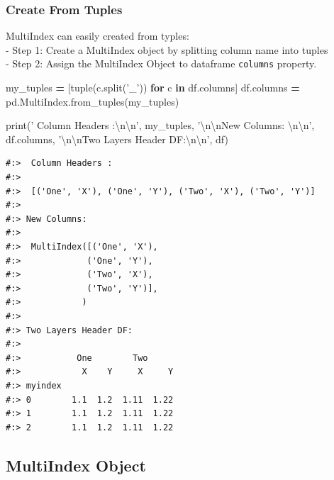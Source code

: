 \documentclass[
]{book}
\newenvironment{Shaded}{\begin{snugshade}}{\end{snugshade}}
\newcommand{\BuiltInTok}[1]{#1}
\newcommand{\CharTok}[1]{\textcolor[rgb]{0.5,0.5,0.5}{#1}}
\newcommand{\ControlFlowTok}[1]{\textcolor[rgb]{0.27,0.27,0.27}{\textbf{#1}}}
\newcommand{\KeywordTok}[1]{\textcolor[rgb]{0.27,0.27,0.27}{\textbf{#1}}}
\newcommand{\NormalTok}[1]{#1}
\newcommand{\OperatorTok}[1]{\textcolor[rgb]{0.43,0.43,0.43}{\textbf{#1}}}
\newcommand{\StringTok}[1]{\textcolor[rgb]{0.5,0.5,0.5}{#1}}
\begin{document}
\hypertarget{create-from-tuples}{%
\subsubsection{Create From Tuples}\label{create-from-tuples}}

MultiIndex can easily created from typles:\\
- Step 1: Create a MultiIndex object by splitting column name into tuples\\
- Step 2: Assign the MultiIndex Object to dataframe \texttt{columns} property.

\begin{Shaded}
\begin{Highlighting}[]
\NormalTok{my_tuples }\OperatorTok{=}\NormalTok{ [}\BuiltInTok{tuple}\NormalTok{(c.split(}\StringTok{'_'}\NormalTok{)) }\ControlFlowTok{for}\NormalTok{ c }\KeywordTok{in}\NormalTok{ df.columns]}
\NormalTok{df.columns }\OperatorTok{=}\NormalTok{ pd.MultiIndex.from_tuples(my_tuples)}

\BuiltInTok{print}\NormalTok{(}\StringTok{' Column Headers :}\CharTok{\textbackslash{}n\textbackslash{}n}\StringTok{'}\NormalTok{,           my_tuples,}
        \StringTok{'}\CharTok{\textbackslash{}n\textbackslash{}n}\StringTok{New Columns: }\CharTok{\textbackslash{}n\textbackslash{}n}\StringTok{'}\NormalTok{,         df.columns,}
        \StringTok{'}\CharTok{\textbackslash{}n\textbackslash{}n}\StringTok{Two Layers Header DF:}\CharTok{\textbackslash{}n\textbackslash{}n}\StringTok{'}\NormalTok{, df)}
\end{Highlighting}
\end{Shaded}

\begin{verbatim}
#:>  Column Headers :
#:> 
#:>  [('One', 'X'), ('One', 'Y'), ('Two', 'X'), ('Two', 'Y')] 
#:> 
#:> New Columns: 
#:> 
#:>  MultiIndex([('One', 'X'),
#:>             ('One', 'Y'),
#:>             ('Two', 'X'),
#:>             ('Two', 'Y')],
#:>            ) 
#:> 
#:> Two Layers Header DF:
#:> 
#:>           One        Two      
#:>            X    Y     X     Y
#:> myindex                      
#:> 0        1.1  1.2  1.11  1.22
#:> 1        1.1  1.2  1.11  1.22
#:> 2        1.1  1.2  1.11  1.22
\end{verbatim}

\hypertarget{multiindex-object}{%
\subsection{MultiIndex Object}\label{multiindex-object}}
\end{document}
